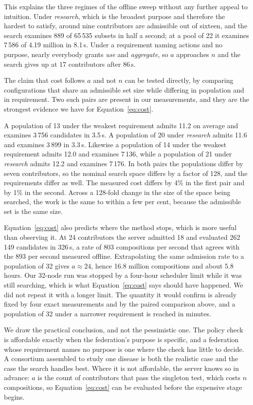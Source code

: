 \documentclass[10pt,conference]{IEEEtran}
\begin{document}
This explains the three regimes of the offline sweep without any further
appeal to intuition. Under \emph{research}, which is the broadest purpose and
therefore the hardest to satisfy, around nine contributors are admissible out
of sixteen, and the search examines 889 of 65\,535 subsets in half a second; at
a pool of 22 it examines 7\,586 of 4.19 million in 8.1\,s. Under a requirement
naming actions and no purpose, nearly everybody grants \emph{use} and
\emph{aggregate}, so $a$ approaches $n$ and the search gives up at 17
contributors after 86\,s.

The claim that cost follows $a$ and not $n$ can be tested directly, by
comparing configurations that share an admissible set size while differing in
population and in requirement. Two such pairs are present in our measurements,
and they are the strongest evidence we have for
Equation~\ref{eq:cost}.

A population of 13 under the weakest requirement admits 11.2 on average and
examines 3\,756 candidates in 3.5\,s. A population of 20 under \emph{research}
admits 11.6 and examines 3\,899 in 3.3\,s. Likewise a population of 14 under
the weakest requirement admits 12.0 and examines 7\,136, while a population of
21 under \emph{research} admits 12.2 and examines 7\,176. In both pairs the
populations differ by seven contributors, so the nominal search space differs
by a factor of 128, and the requirements differ as well. The measured cost
differs by 4\% in the first pair and by 1\% in the second. Across a
128-fold change in the size of the space being searched, the work is the same
to within a few per cent, because the admissible set is the same size.

Equation~\ref{eq:cost} also predicts where the method stops, which is more
useful than observing it. At 24 contributors the server admitted 18 and
evaluated 262\,149 candidates in 326\,s, a rate of 803 compositions per second
that agrees with the 893 per second measured offline. Extrapolating the same
admission rate to a population of 32 gives $a \approx 24$, hence 16.8 million
compositions and about 5.8 hours. Our 32-node run was stopped by a four-hour
scheduler limit while it was still searching, which is what
Equation~\ref{eq:cost} says should have happened. We did not repeat it with a
longer limit. The quantity it would confirm is already fixed by four exact
measurements and by the paired comparison above, and a population of 32 under a
narrower requirement is reached in minutes.

We draw the practical conclusion, and not the pessimistic one. The policy check
is affordable exactly when the federation's purpose is specific, and a
federation whose requirement names no purpose is one where the check has little
to decide. A consortium assembled to study one disease is both the realistic
case and the case the search handles best. Where it is not affordable, the
server knows so in advance: $a$ is the count of contributors that pass the
singleton test, which costs $n$ compositions, so Equation~\ref{eq:cost} can be
evaluated before the expensive stage begins.
\end{document}
